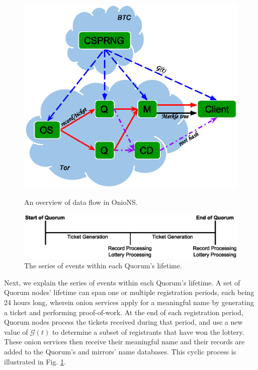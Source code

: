 \documentclass[USenglish,oneside,twocolumn]{article}
\begin{document}
\begin{figure}[t!] %
	\centering
	
	\includegraphics[width=0.88\linewidth]{../assets/images/protocol_overview.eps}
	\caption{An overview of data flow in OnioNS. }
	\label{fig:dataFlow}
	
	\hspace{0px}
	\vspace{-10pt}	
	\includegraphics[width=\linewidth]{../assets/images/quorum_timeline.eps}
	\caption{The series of events within each Quorum's lifetime. }
	\label{fig:quorumTimeline}
	\vspace{-7pt}
\end{figure}

Next, we explain the series of events within each Quorum's lifetime. A set of Quorum nodes' lifetime can span one or multiple registration periods, each being 24 hours long, wherein onion services apply for a meaningful name by generating a ticket and performing proof-of-work. At the end of each registration period, Quorum nodes process the tickets received during that period, and use a new value of $ \mathcal{G}(t) $ to determine a subset of registrants that have won the lottery. These onion services then receive their meaningful name and their records are added to the Quorum's and mirrors' name databases. This cyclic process is illustrated in Fig. \ref{fig:quorumTimeline}.
\end{document}
